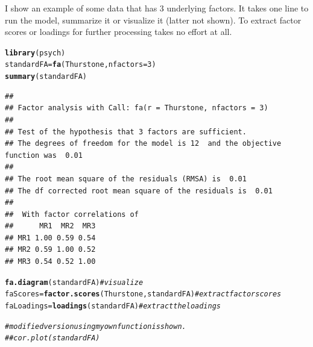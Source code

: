 \documentclass[english,nohyper,titlepage]{tufte-handout}\usepackage[]{graphicx}\usepackage[]{color}
\makeatletter
\newcommand{\hlnum}[1]{\textcolor[rgb]{0.686,0.059,0.569}{#1}}%
\newcommand{\hlcom}[1]{\textcolor[rgb]{0.678,0.584,0.686}{\textit{#1}}}%
\newcommand{\hlstd}[1]{\textcolor[rgb]{0.345,0.345,0.345}{#1}}%
\newcommand{\hlkwb}[1]{\textcolor[rgb]{0.69,0.353,0.396}{#1}}%
\newcommand{\hlkwc}[1]{\textcolor[rgb]{0.333,0.667,0.333}{#1}}%
\newcommand{\hlkwd}[1]{\textcolor[rgb]{0.737,0.353,0.396}{\textbf{#1}}}%
\newenvironment{kframe}{%
 \def\at@end@of@kframe{}%
 \ifinner\ifhmode%
  \def\at@end@of@kframe{\end{minipage}}%
  \begin{minipage}{\columnwidth}%
 \fi\fi%
 \def\FrameCommand##1{\hskip\@totalleftmargin \hskip-\fboxsep
 \colorbox{shadecolor}{##1}\hskip-\fboxsep
     \hskip-\linewidth \hskip-\@totalleftmargin \hskip\columnwidth}%
 \MakeFramed {\advance\hsize-\width
   \@totalleftmargin\z@ \linewidth\hsize
   \@setminipage}}%
 {\par\unskip\endMakeFramed%
 \at@end@of@kframe}
\newenvironment{knitrout}{}{} %
\makeatother
\begin{document}
I show an example of some data that has 3 underlying factors.  It takes one line to run the model, summarize it or visualize it (latter not shown).  To extract factor scores or loadings for further processing takes no effort at all. 

\begin{knitrout}\footnotesize
{}\color{fgcolor}\begin{kframe}
\begin{alltt}
\hlkwd{library}\hlstd{(psych)}
\hlstd{standardFA} \hlkwb{=} \hlkwd{fa}\hlstd{(Thurstone,} \hlkwc{nfactors} \hlstd{=} \hlnum{3}\hlstd{)}
\hlkwd{summary}\hlstd{(standardFA)}
\end{alltt}
\begin{verbatim}
## 
## Factor analysis with Call: fa(r = Thurstone, nfactors = 3)
## 
## Test of the hypothesis that 3 factors are sufficient.
## The degrees of freedom for the model is 12  and the objective function was  0.01 
## 
## The root mean square of the residuals (RMSA) is  0.01 
## The df corrected root mean square of the residuals is  0.01 
## 
##  With factor correlations of 
##      MR1  MR2  MR3
## MR1 1.00 0.59 0.54
## MR2 0.59 1.00 0.52
## MR3 0.54 0.52 1.00
\end{verbatim}
\begin{alltt}
\hlkwd{fa.diagram}\hlstd{(standardFA)} \hlcom{# visualize}
\hlstd{faScores} \hlkwb{=} \hlkwd{factor.scores}\hlstd{(Thurstone, standardFA)} \hlcom{# extract factor scores}
\hlstd{faLoadings} \hlkwb{=} \hlkwd{loadings}\hlstd{(standardFA)} \hlcom{# extract the loadings}

\hlcom{# modified version using my own function is shown.}
\hlcom{## cor.plot(standardFA)}
\end{alltt}
\end{kframe}
\end{knitrout}
\end{document}
